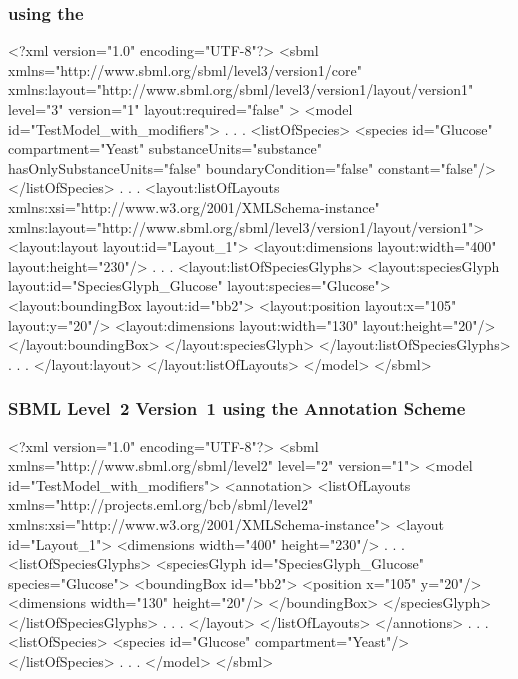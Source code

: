 \subsubsection{\sbmlthreecore using the \LayoutPackage}
\begin{example}
<?xml version="1.0" encoding="UTF-8"?>
<sbml xmlns="http://www.sbml.org/sbml/level3/version1/core" 
		xmlns:layout="http://www.sbml.org/sbml/level3/version1/layout/version1" 
		level="3" version="1" layout:required="false" >		
  <model id="TestModel_with_modifiers">
                .
                .
                .
    <listOfSpecies>
      <species id="Glucose" compartment="Yeast" substanceUnits="substance" 
			hasOnlySubstanceUnits="false" boundaryCondition="false" constant="false"/>
    </listOfSpecies>
                .
                .
                .
    <layout:listOfLayouts xmlns:xsi="http://www.w3.org/2001/XMLSchema-instance" 
		xmlns:layout="http://www.sbml.org/sbml/level3/version1/layout/version1">
      <layout:layout layout:id="Layout_1">
        <layout:dimensions layout:width="400" layout:height="230"/>
                .
                .
                .
        <layout:listOfSpeciesGlyphs>
          <layout:speciesGlyph layout:id="SpeciesGlyph_Glucose"  layout:species="Glucose">
            <layout:boundingBox layout:id="bb2">
              <layout:position layout:x="105" layout:y="20"/>
              <layout:dimensions layout:width="130" layout:height="20"/>
            </layout:boundingBox>
          </layout:speciesGlyph>
        </layout:listOfSpeciesGlyphs>					
                .
                .
                .
			</layout:layout>
		</layout:listOfLayouts>
  </model>
</sbml>
\end{example}
\pagebreak
\subsubsection{SBML Level~2 Version~1 using the Annotation Scheme}
\begin{example}
<?xml version="1.0" encoding="UTF-8"?>
<sbml xmlns="http://www.sbml.org/sbml/level2" level="2" version="1">
  <model id="TestModel_with_modifiers">
    <annotation>
     <listOfLayouts xmlns="http://projects.eml.org/bcb/sbml/level2"
              xmlns:xsi="http://www.w3.org/2001/XMLSchema-instance">
      <layout id="Layout_1">
        <dimensions width="400" height="230"/>
                .
                .
                .
        <listOfSpeciesGlyphs>
          <speciesGlyph id="SpeciesGlyph_Glucose" species="Glucose">
            <boundingBox id="bb2">
              <position x="105" y="20"/>
              <dimensions width="130" height="20"/>
            </boundingBox>
          </speciesGlyph>
        </listOfSpeciesGlyphs>  
            .
            .
            . 
       </layout>
      </listOfLayouts>
    </annotions>
         .
         .
         .
    <listOfSpecies>
      <species id="Glucose" compartment="Yeast"/>
    </listOfSpecies>
       .
       .
       .  
  </model>
</sbml>
\end{example}


